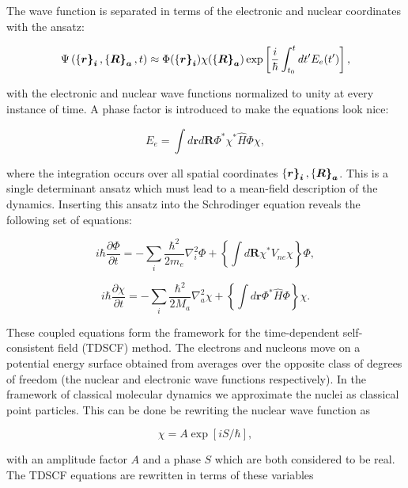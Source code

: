 The wave function is separated in terms of the electronic and nuclear
coordinates with the ansatz:

\begin{equation}
 \Psi \left(\left\{\bm{r\right\}_i}, \left\{\bm{R\right\}_a}, t \right)
    \approx \Phi(\left\{\bm{r\right\}_i}) \chi(\left\{\bm{R\right\}_a})
    \exp \left[ \frac{i}{\hbar} \int_{t_0}^t
    dt' E_e(t') \right] ,
\end{equation}

with the electronic and nuclear wave functions normalized to unity
at every instance of time. A phase factor is introduced to make
the equations look nice:

\begin{equation}
 E_e = \int d\bm{r} d\bm{R} \Phi^* \chi^* \hat{H} \Phi \chi , 
\end{equation}

where the integration occurs over all spatial coordinates
$\left\{\bm{r\right\}_i}, \left\{\bm{R\right\}_a}$. This is a single determinant
ansatz which must lead to a mean-field description of the dynamics.
Inserting this ansatz into the Schrodinger equation
reveals the following set of equations:

\begin{equation}
 i\hbar \frac{\partial \Phi}{\partial t}
    = -\sum_i \frac{\hbar^2}{2m_e} \nabla_i^2 \Phi
    + \left\{ \int d\bm{R} \chi^* V_{ne} \chi \right\} \Phi , 
\end{equation}

\begin{equation}
 i\hbar \frac{\partial \chi}{\partial t}
    = -\sum_i \frac{\hbar^2}{2M_a} \nabla_a^2 \chi
    + \left\{ \int d\bm{r} \Phi^* \hat{H} \Phi \right\} \chi . 
\end{equation}

These coupled equations form the framework for the
time-dependent self-consistent field (TDSCF) method.
The electrons and nucleons move on a potential energy surface
obtained from averages over the opposite class of
degrees of freedom (the nuclear and electronic wave functions
respectively).
In the framework of classical molecular dynamics
we approximate the nuclei as classical point particles.
This can be done be rewriting the nuclear wave function as

\begin{equation}
 \chi = A \exp[iS/\hbar] , 
\end{equation}

with an amplitude factor $A$ and a phase $S$
which are both considered to be real.
The TDSCF equations are rewritten in terms of these variables

